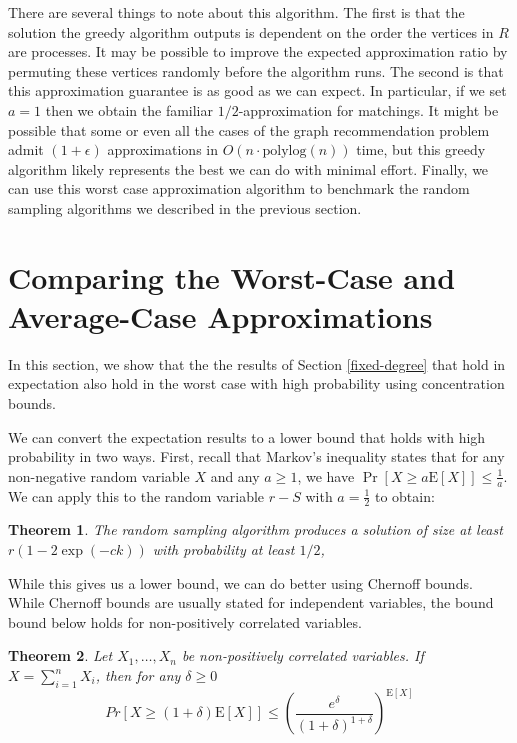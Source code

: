 \documentclass[11pt]{article}
\newcommand{\E}{\text{E}}
\newtheorem{thm}{Theorem}
\begin{document}
There are several things to note about this algorithm. The first is
that the solution the greedy algorithm outputs is dependent on the
order the vertices in $R$ are processes. It may be possible to improve
the expected approximation ratio by permuting these vertices randomly
before the algorithm runs. The second is that this approximation
guarantee is as good as we can expect. In particular, if we set $a=1$
then we obtain the familiar $1/2$-approximation for matchings. It
might be possible that some or even all the cases of the graph
recommendation problem admit $(1+\epsilon)$ approximations in
$O(n\cdot \text{polylog}(n))$ time, but this greedy algorithm likely
represents the best we can do with minimal effort. Finally, we can use
this worst case approximation algorithm to benchmark the random
sampling algorithms we described in the previous section.

\label{worst-vs-avg}
\section{Comparing the Worst-Case and Average-Case Approximations}
In this section, we show that the the results of Section
\ref{fixed-degree} that hold in expectation also hold in the worst
case with high probability using concentration bounds.

We can convert the expectation results to a lower bound that holds
with high probability in two ways. First, recall that Markov's
inequality states that for any non-negative random variable $X$ and
any $a\geq 1$, we have $\Pr[X \geq a\E[X]] \leq \frac{1}{a}$. We can
apply this to the random variable $r-S$ with $a=\frac{1}{2}$ to
obtain:

\begin{thm}
The random sampling algorithm produces a solution of size at least $r(1-2\exp(-ck))$ with probability at least $1/2$, 
\end{thm}

While this gives us a lower bound, we can do better using Chernoff
bounds. While Chernoff bounds are usually stated for independent
variables, the bound bound below holds for non-positively correlated
variables.

\begin{thm}
Let $X_1,\ldots, X_n$ be non-positively correlated variables. If $X=\sum_{i=1}^n X_i$, then for any $\delta\geq 0$
\[ Pr[X \geq (1+\delta)\E[X] ] \leq \left(\frac{e^\delta}{(1+\delta)^{1+\delta}}\right)^{\E[X]} \]
\end{thm}
\end{document}
